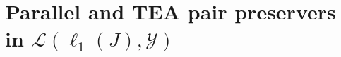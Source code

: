 \documentclass{amsart}
\theoremstyle{definition}
\theoremstyle{remark}
\numberwithin{equation}{section}
\begin{document}

\section{Parallel and TEA pair preservers in $\mathcal{L}(\ell_1(J),\mathcal{Y})$} \label{sec-l1}
\end{document}
